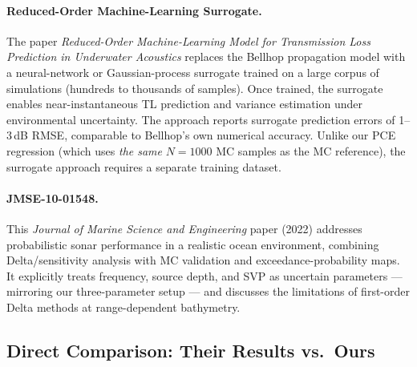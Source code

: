\documentclass[11pt,a4paper]{article}
\begin{document}
\paragraph{Reduced-Order Machine-Learning Surrogate.}
The paper \emph{Reduced-Order Machine-Learning Model for Transmission Loss
Prediction in Underwater Acoustics} replaces the Bellhop propagation model with
a neural-network or Gaussian-process surrogate trained on a large corpus of
simulations (hundreds to thousands of samples).
Once trained, the surrogate enables near-instantaneous TL prediction and variance
estimation under environmental uncertainty.
The approach reports surrogate prediction errors of 1--3\,dB RMSE, comparable to
Bellhop's own numerical accuracy.
Unlike our PCE regression (which uses \emph{the same} $N=1000$ MC samples as the
MC reference), the surrogate approach requires a separate training dataset.

\paragraph{JMSE-10-01548.}
This \emph{Journal of Marine Science and Engineering} paper (2022) addresses
probabilistic sonar performance in a realistic ocean environment, combining
Delta/sensitivity analysis with MC validation and exceedance-probability maps.
It explicitly treats frequency, source depth, and SVP as uncertain parameters —
mirroring our three-parameter setup — and discusses the limitations of first-order
Delta methods at range-dependent bathymetry.

\subsection{Direct Comparison: Their Results vs.\ Ours}
\label{sec:comparison}
\end{document}
